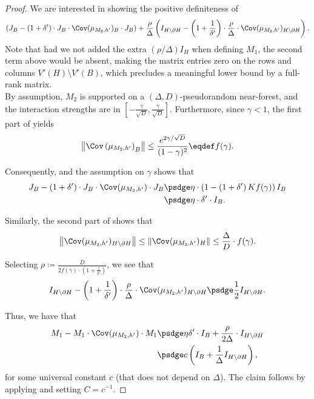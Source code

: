 \documentclass[11pt,letterpaper]{article}
\begin{document}
\begin{proof}
        We are interested in showing the positive definiteness of
        \[ 
            \left(J_B - (1+\delta') \cdot J_B \cdot \Cov(\mu_{M_2,h'})_B \cdot J_B\right) + \frac{\rho}{\Delta}\left( I_{H \setminus \partial H} - \left( 1 + \frac{1}{\delta'}\right) \cdot \frac{\rho}{\Delta} \cdot \Cov(\mu_{M_2,h'})_{H \setminus \partial H} \right). 
        \]
        Note that had we not added the extra $(\rho/\Delta) I_H$ when defining $M_1$, the second term above would be absent, making the matrix entries zero on the rows and columns $V'(H) \setminus V'(B)$, which precludes a meaningful lower bound by a full-rank matrix.\\

        By assumption, $M_2$ is supported on a $(\Delta, D)$-pseudorandom near-forest, and the interaction strengths are in $\left[ -\frac{\gamma}{\sqrt{D}} , \frac{\gamma}{\sqrt{D}} \right]$. Furthermore, since $\gamma < 1$, the first part of  yields
        \begin{align*}
            \left\| \Cov\left( \mu_{M_2,h'} \right)_B \right\| \le \frac{e^{2\gamma/\sqrt{D}}}{(1-\gamma)^2} \eqdef f(\gamma).
        \end{align*}

        Consequently,  and the assumption on $\gamma$ shows that
        \begin{align*}
             J_B - \left( 1 + \delta' \right) \cdot J_B \cdot \Cov(\mu_{M_2,h'}) \cdot J_B &\psdge \eta \cdot \left(1 - \left( 1 + \delta' \right) K f(\gamma)\right) I_B  \\
             &\psdge \eta \cdot \delta' \cdot I_B.
        \end{align*}

        Similarly, the second part of  shows that
        \[ 
            \left\|\Cov(\mu_{M_2,h'})_{H \setminus \partial H}\right\| \le \left\|\Cov(\mu_{M_2,h'})_{H}\right\| \le \frac{\Delta}{D} \cdot f(\gamma).
        \]
        
        Selecting $\rho \coloneqq \frac{D}{2 f(\gamma) \cdot \left( 1 + \frac{1}{\delta'} \right)}$, we see that
        \[ 
            I_{H \setminus \partial H} - \left(1 + \frac{1}{\delta'}\right) \cdot \frac{\rho}{\Delta} \cdot \Cov(\mu_{M_2,h'})_{H \setminus \partial H} \psdge \frac{1}{2} I_{H \setminus \partial H}.
         \]
        
        Thus, we have that
        \begin{align*}
            M_1 - M_1 \cdot \Cov(\mu_{M_2,h'}) \cdot M_1 &\psdge \eta \delta' \cdot  I_B + \frac{\rho}{2\Delta} \cdot I_{H \setminus \partial H} \\
            &\psdge c\left(I_B + \frac{1}{\Delta}I_{H \setminus \partial H}\right),
        \end{align*}
        for some universal constant $c$ (that does not depend on $\Delta$).
        The claim follows by applying  and setting $C = c^{-1}$. 
    \end{proof}
\end{document}
